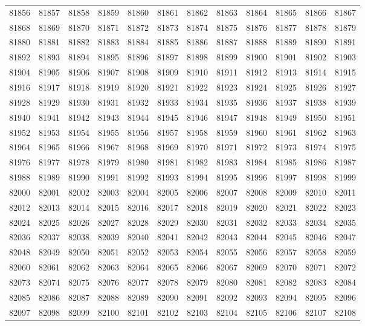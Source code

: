 \begin{center}
\begin{longtable}{llllllllllll}
81856 &81857 &81858 &81859 &81860 &81861 &81862 &81863 &81864 &81865 &81866 &81867 \\
81868 &81869 &81870 &81871 &81872 &81873 &81874 &81875 &81876 &81877 &81878 &81879 \\
81880 &81881 &81882 &81883 &81884 &81885 &81886 &81887 &81888 &81889 &81890 &81891 \\
81892 &81893 &81894 &81895 &81896 &81897 &81898 &81899 &81900 &81901 &81902 &81903 \\
81904 &81905 &81906 &81907 &81908 &81909 &81910 &81911 &81912 &81913 &81914 &81915 \\
81916 &81917 &81918 &81919 &81920 &81921 &81922 &81923 &81924 &81925 &81926 &81927 \\
81928 &81929 &81930 &81931 &81932 &81933 &81934 &81935 &81936 &81937 &81938 &81939 \\
81940 &81941 &81942 &81943 &81944 &81945 &81946 &81947 &81948 &81949 &81950 &81951 \\
81952 &81953 &81954 &81955 &81956 &81957 &81958 &81959 &81960 &81961 &81962 &81963 \\
81964 &81965 &81966 &81967 &81968 &81969 &81970 &81971 &81972 &81973 &81974 &81975 \\
81976 &81977 &81978 &81979 &81980 &81981 &81982 &81983 &81984 &81985 &81986 &81987 \\
81988 &81989 &81990 &81991 &81992 &81993 &81994 &81995 &81996 &81997 &81998 &81999 \\
82000 &82001 &82002 &82003 &82004 &82005 &82006 &82007 &82008 &82009 &82010 &82011 \\
82012 &82013 &82014 &82015 &82016 &82017 &82018 &82019 &82020 &82021 &82022 &82023 \\
82024 &82025 &82026 &82027 &82028 &82029 &82030 &82031 &82032 &82033 &82034 &82035 \\
82036 &82037 &82038 &82039 &82040 &82041 &82042 &82043 &82044 &82045 &82046 &82047 \\
82048 &82049 &82050 &82051 &82052 &82053 &82054 &82055 &82056 &82057 &82058 &82059 \\
82060 &82061 &82062 &82063 &82064 &82065 &82066 &82067 &82069 &82070 &82071 &82072 \\
82073 &82074 &82075 &82076 &82077 &82078 &82079 &82080 &82081 &82082 &82083 &82084 \\
82085 &82086 &82087 &82088 &82089 &82090 &82091 &82092 &82093 &82094 &82095 &82096 \\
82097 &82098 &82099 &82100 &82101 &82102 &82103 &82104 &82105 &82106 &82107 &82108 \\

\end{longtable}
\end{center}
